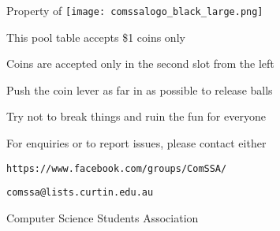 \documentclass[a4paper]{minimal}
\begin{document}
\fontsize{35.83pt}{1em}
\selectfont

\begin{center}
	Property of
	\hspace{1cm}
	\raisebox{-.5\height}
	{\texttt{[image: comssalogo\_black\_large.png]}}
\end{center}

\fontsize{24.88pt}{1.1em}
\selectfont

\begin{list}{\textbullet\hspace{0.5em}}{}
	\item This pool table accepts \$1 coins only
	\item Coins are accepted only in the second slot from the left
	\item Push the coin lever as far in as possible to release balls
	\item Try not to break things and ruin the fun for everyone
	\item For enquiries or to report issues, please contact either
	\begin{list}{\hspace{1.5em}\textbullet\hspace{0.5em}}{}
		\item \texttt{https://www.facebook.com/groups/ComSSA/}
		\item \texttt{comssa@lists.curtin.edu.au}
	\end{list}
\end{list}

\fontsize{12pt}{1em}
\selectfont

\begin{center}
	Computer Science Students Association
\end{center}
\end{document}
